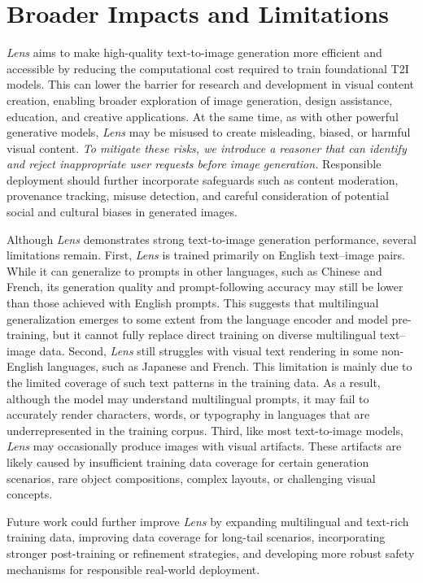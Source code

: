 \section{Broader Impacts and Limitations}
\label{sec:limitations}

\textit{Lens} aims to make high-quality text-to-image generation more efficient and accessible by reducing the computational cost required to train foundational T2I models. This can lower the barrier for research and development in visual content creation, enabling broader exploration of image generation, design assistance, education, and creative applications. At the same time, as with other powerful generative models, \textit{Lens} may be misused to create misleading, biased, or harmful visual content. \textit{To mitigate these risks, we introduce a reasoner that can identify and reject inappropriate user requests before image generation.} Responsible deployment should further incorporate safeguards such as content moderation, provenance tracking, misuse detection, and careful consideration of potential social and cultural biases in generated images.

Although \textit{Lens} demonstrates strong text-to-image generation performance, several limitations remain. First, \textit{Lens} is trained primarily on English text--image pairs. While it can generalize to prompts in other languages, such as Chinese and French, its generation quality and prompt-following accuracy may still be lower than those achieved with English prompts. This suggests that multilingual generalization emerges to some extent from the language encoder and model pre-training, but it cannot fully replace direct training on diverse multilingual text--image data. Second, \textit{Lens} still struggles with visual text rendering in some non-English languages, such as Japanese and French. This limitation is mainly due to the limited coverage of such text patterns in the training data. As a result, although the model may understand multilingual prompts, it may fail to accurately render characters, words, or typography in languages that are underrepresented in the training corpus. Third, like most text-to-image models, \textit{Lens} may occasionally produce images with visual artifacts. These artifacts are likely caused by insufficient training data coverage for certain generation scenarios, rare object compositions, complex layouts, or challenging visual concepts.

Future work could further improve \textit{Lens} by expanding multilingual and text-rich training data, improving data coverage for long-tail scenarios, incorporating stronger post-training or refinement strategies, and developing more robust safety mechanisms for responsible real-world deployment.